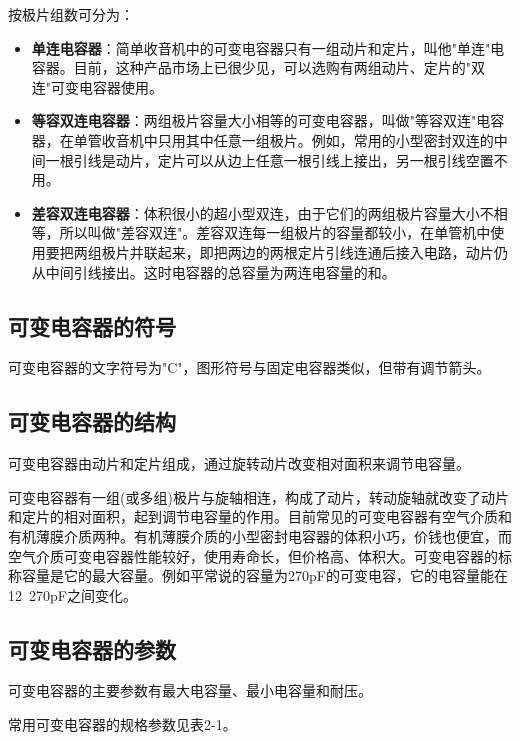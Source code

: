 \documentclass[12pt,UTF8]{ctexbook}
\begin{document}
按极片组数可分为：

\begin{itemize}[leftmargin=2cm]
	\item \textbf{单连电容器}：简单收音机中的可变电容器只有一组动片和定片，叫他"单连"电容器。目前，这种产品市场上已很少见，可以选购有两组动片、定片的"双连"可变电容器使用。
	\item \textbf{等容双连电容器}：两组极片容量大小相等的可变电容器，叫做"等容双连"电容器，在单管收音机中只用其中任意一组极片。例如，常用的小型密封双连的中间一根引线是动片，定片可以从边上任意一根引线上接出，另一根引线空置不用。
	\item \textbf{差容双连电容器}：体积很小的超小型双连，由于它们的两组极片容量大小不相等，所以叫做"差容双连"。差容双连每一组极片的容量都较小，在单管机中使用要把两组极片并联起来，即把两边的两根定片引线连通后接入电路，动片仍从中间引线接出。这时电容器的总容量为两连电容量的和。
\end{itemize}

\subsection{可变电容器的符号}

可变电容器的文字符号为"C"，图形符号与固定电容器类似，但带有调节箭头。

\subsection{可变电容器的结构}

可变电容器由动片和定片组成，通过旋转动片改变相对面积来调节电容量。

可变电容器有一组(或多组)极片与旋轴相连，构成了动片，转动旋轴就改变了动片和定片的相对面积，起到调节电容量的作用。目前常见的可变电容器有空气介质和有机薄膜介质两种。有机薄膜介质的小型密封电容器的体积小巧，价钱也便宜，而空气介质可变电容器性能较好，使用寿命长，但价格高、体积大。可变电容器的标称容量是它的最大容量。例如平常说的容量为270pF的可变电容，它的电容量能在12~270pF之间变化。

\subsection{可变电容器的参数}

可变电容器的主要参数有最大电容量、最小电容量和耐压。

常用可变电容器的规格参数见表2-1。
\end{document}
